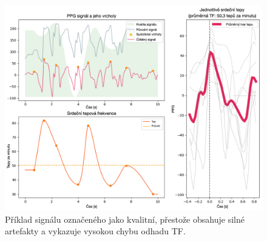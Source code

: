 \begin{figure}[ht]
	\centering
	\includegraphics[width=1\textwidth]{./obrazky/quality/good_but_not_good.png}
	\caption[Signál označený databází za kvalitní]{Příklad signálu označeného jako kvalitní, přestože obsahuje silné artefakty a vykazuje vysokou chybu odhadu \acs{TF}.}
	\label{fig:bad_quality_passed}
\end{figure}
